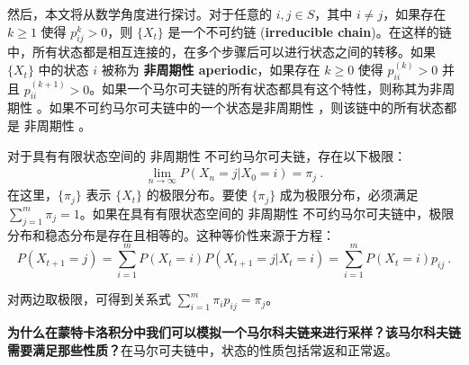 然后，本文将从数学角度进行探讨。对于任意的 $i,j\in S$，其中 $i \neq j$，如果存在 $k\geq 1$ 使得 $p_{ij}^k > 0$，则 $\{X_t\}$ 是一个不可约链 (\textbf{irreducible chain})。在这样的链中，所有状态都是相互连接的，在多个步骤后可以进行状态之间的转移。如果 $\{X_t\}$ 中的状态 $i$ 被称为 \textbf{非周期性  aperiodic}，如果存在 $k\geq 0$ 使得 $p_{ii}^{(k)} > 0$ 并且 $p_{ii}^{(k+1) } > 0$。如果一个马尔可夫链的所有状态都具有这个特性，则称其为非周期性 。如果不可约马尔可夫链中的一个状态是非周期性  ，则该链中的所有状态都是 非周期性 。

对于具有有限状态空间的 非周期性 不可约马尔可夫链，存在以下极限：
\begin{align}
   \lim_{n\to\infty} P(X_n = j | X_0=i) = \pi_j~.
\end{align}
在这里，$\{\pi_j\}$ 表示 $\{X_t\}$ 的极限分布。要使 $\{\pi_j\}$ 成为极限分布，必须满足 $\sum_{j=1}^m \pi_j=1$。如果在具有有限状态空间的 非周期性  不可约马尔可夫链中，极限分布和稳态分布是存在且相等的。这种等价性来源于方程：
\begin{equation} 
P(X_{t+1}=j)=\sum_{i=1}^{m}P(X_{t}=i)P(X_{t+1}=j|X_ {t}=i)=\sum_{i=1}^{m}P(X_{t}=i)p_{i j}~.
\end{equation}

对两边取极限，可得到关系式 $\sum_{i=1}^m \pi_i p_{ij} = \pi_j$。 

\textbf{为什么在蒙特卡洛积分中我们可以模拟一个马尔科夫链来进行采样？该马尔科夫链需要满足那些性质？}在马尔可夫链中，状态的性质包括常返和正常返。